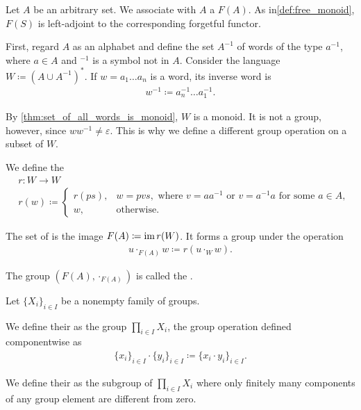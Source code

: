 \begin{definition}\label{def:free_group}\cite[306]{Knapp2016BAlg}
  Let \( A \) be an arbitrary set. We associate with \( A \) a  \( F(A) \). As in\cref{def:free_monoid}, \( F(S) \) is left-adjoint to the corresponding forgetful functor.

  First, regard \( A \) as an alphabet and define the set \( A^{-1} \) of words of the type \( a^{-1} \), where \( a \in A \) and \( \mbox{}^{-1} \) is a symbol not in \( A \). Consider the language \( W \coloneqq (A \cup A^{-1})^{*} \). If \( w = a_1 \ldots a_n \) is a word, its inverse word is
  \begin{align*}
    w^{-1} \coloneqq a_n^{-1} \ldots a_1^{-1}.
  \end{align*}

  By \cref{thm:set_of_all_words_is_monoid}, \( W \) is a monoid. It is not a group, however, since \( w w^{-1} \neq \varepsilon \). This is why we define a different group operation on a subset of \( W \).

  We define the 
  \begin{align*}
    &r: W \to W \\
    &r(w) \coloneqq \begin{cases}
      r(ps), &w = pvs, \text{ where } v = aa^{-1} \text{ or } v = a^{-1}a \text{ for some } a \in A, \\
      w, &\text{otherwise}.
    \end{cases}
  \end{align*}

  The set of  is the image \( F(A) \coloneqq \operatorname{im} r(W) \). It forms a group under the operation
  \begin{align*}
    u \cdot_{F(A)} w \coloneqq r(u \cdot_{W} w).
  \end{align*}

  The group \( (F(A), \cdot_{F(A)}) \) is called the .
\end{definition}

\begin{definition}\label{def:group_direct_product}
  Let \( \{ X_i \}_{i \in I} \) be a nonempty family of groups.

  We define their  as the group \( \prod_{i \in I} X_i \), the group operation defined componentwise as
  \begin{align*}
    \{ x_i \}_{i \in I} \cdot \{ y_i \}_{i \in I}
    \coloneqq
    \{ x_i \cdot y_i \}_{i \in I}.
  \end{align*}

  We define their  as the subgroup of \( \prod_{i \in I} X_i \) where only finitely many components of any group element are different from zero.
\end{definition}

